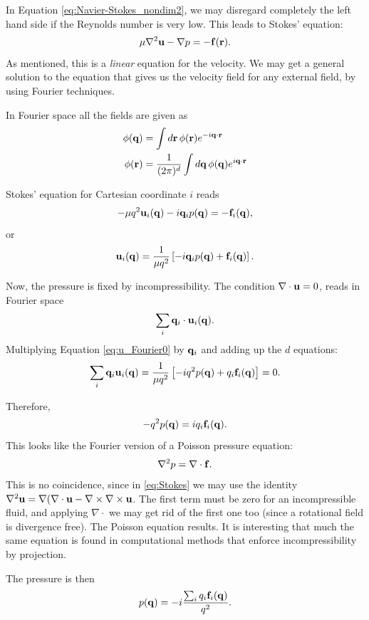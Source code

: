 In Equation \ref{eq:Navier-Stokes_nondim2}, we may disregard
completely the left hand side if the Reynolds number is very low. This
leads to Stokes' equation:
\begin{equation}
\label{eq:Stokes}
\mu \nabla^2 \mathbf{u} -\nabla p = - \mathbf{f}(\mathbf{r}) .
\end{equation}
As mentioned, this is a \emph{linear} equation for the velocity.  We
may get a general solution to the equation that gives us the velocity
field for any external field, by using Fourier techniques.

In Fourier space all the fields are given as
\begin{align}
\phi(\mathbf{q}) &=                    \int d\mathbf{r} \, \phi(\mathbf{r}) e^{-i\mathbf{q}\cdot\mathbf{r}}  \\
\phi(\mathbf{r}) &= \frac 1{(2\pi)^d}  \int d\mathbf{q} \, \phi(\mathbf{q}) e^{ i\mathbf{q}\cdot\mathbf{r}} 
\end{align}

Stokes' equation for Cartesian coordinate $i$ reads
\cite{bray2002theory}
\[
-\mu q^2 \mathbf{u}_i(\mathbf{q}) - i \mathbf{q}_i p(\mathbf{q}) = - \mathbf{f}_i(\mathbf{q}) ,
\]
or
\begin{equation}
\label{eq:u_Fourier0}
\mathbf{u}_i(\mathbf{q}) = \frac 1{\mu q^2}
\left[
  - i \mathbf{q}_i p(\mathbf{q}) + \mathbf{f}_i(\mathbf{q}) 
\right] .
\end{equation}

Now, the pressure is fixed by incompressibility. The condition
$\nabla\cdot\mathbf{u}=0$, reads in Fourier space
\[
  \sum_i\mathbf{q}_i\cdot\mathbf{u}_i(\mathbf{q}) .
\]
Multiplying Equation \ref{eq:u_Fourier0} by $\mathbf{q}_i$ and adding up the
$d$ equations:
\[
\sum_i \mathbf{q}_i \mathbf{u}_i(\mathbf{q}) = \frac 1{\mu q^2}
\left[
  - i q^2 p(\mathbf{q}) + q_i\mathbf{f}_i(\mathbf{q}) 
\right] =0 .
\]

Therefore,
\[
  - q^2 p(\mathbf{q}) = i q_i\mathbf{f}_i(\mathbf{q})   .
\]
This looks like the Fourier version of a Poisson pressure equation:
\[
  \nabla^2 p = \nabla\cdot \mathbf{f} .
\]
This is no coincidence, since in \ref{eq:Stokes} we may use the
identity
\(\nabla^2 \mathbf{u} = \nabla(\nabla\cdot\mathbf{u} -
\nabla\times\nabla\times\mathbf{u} \). The first term must be zero for an
incompressible fluid, and applying $\nabla\cdot$ we may get rid of the
first one too (since a rotational field is divergence free). The
Poisson equation results. It is interesting that much the same
equation is found in computational methods that enforce
incompressibility by projection.

The pressure is then
\begin{equation}
\label{eq:p_Fourier0}
p(\mathbf{q}) = -i \frac{\sum_i q_i\mathbf{f}_i(\mathbf{q}) }{q^2} .
\end{equation}

